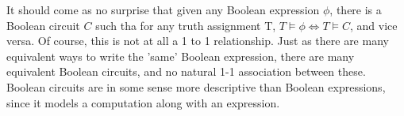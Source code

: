 \documentclass{article}
\theoremstyle{definition}
\newtheorem{definition}{Definition}[section]
\theoremstyle{plain}
\theoremstyle{theorem}
\newtheorem{fact}{Fact}[section]
\begin{document}
\par It should come as no surprise that given any Boolean expression $\phi$, there is a Boolean circuit $C$ such tha for any truth assignment T, $T \models \phi \iff T \models C$, and vice versa. Of course, this is not at all a 1 to 1 relationship. Just as there are many equivalent ways to write the 'same' Boolean expression, there are many equivalent Boolean circuits, and no natural 1-1 association between these. Boolean circuits are in some sense more descriptive than Boolean expressions, since it models a computation along with an expression.
\begin{comment}
\subsection{Linear Algebra}
	\begin{definition}
		A \textbf{vector space} is a triple $(V,F,\phi)$, where $V$ is an abelian group, the elements of which are called \textbf{vectors}, and $F$ is a field, the elements of which are called \textbf{scalars}. $\phi: F \times V \to V$ is a group action, allowing scalars to \textit{act} on the vectors by 'multiplication'. If $\ket{v} \in V$ and $a \in F$, then we will denote $\phi(a,\ket{v}) := a\ket{v}$, reminiscent of multiplication. Recall that by group action, we mean that $a(b\ket{v}) = (ab)\ket{v}$, and that $1\ket{v} = \ket{v}$, where $1$ is the identity of $F$. In addition to this, we will require that scalars can distribute over a sum of vectors, and vice versa. That is, $(a+b)\ket{v} = a\ket{v}+b\ket{v}$, and $a(\ket{u}+\ket{v}) = a\ket{u}+a\ket{v}$.
	\end{definition}
	In a (futile) attempt to keep everything we do notationally consistent, all vectors which are to be viewed first and foremost as elements of a particular space will be denoted with 'bra-ket' notation: Instead of $\vec{v}$, we will write $\ket{v}$. We will still use the hat notation, in cases where linear algebra isn't a consideration (i.e. if we only care about shorthand for an ordered tuple). The typical field of scalars for us will be the complex numbers, and for a complex number of the form $z = x+iy$, recall that the conjugate of $z$ is $\bar{z} = x-iy$. Sometimes we will also use the notation $z^*$ instead of $\bar{z}$.
	\begin{fact}
		Let $-1$ be the additive inverse of $1$, the identity scalar. Then $(-1)\ket{v} = -\ket{v}$, the additive inverse of $\ket{v}$, for any $\ket{v} \in V$.
	\end{fact}

\end{comment}
\end{document}
